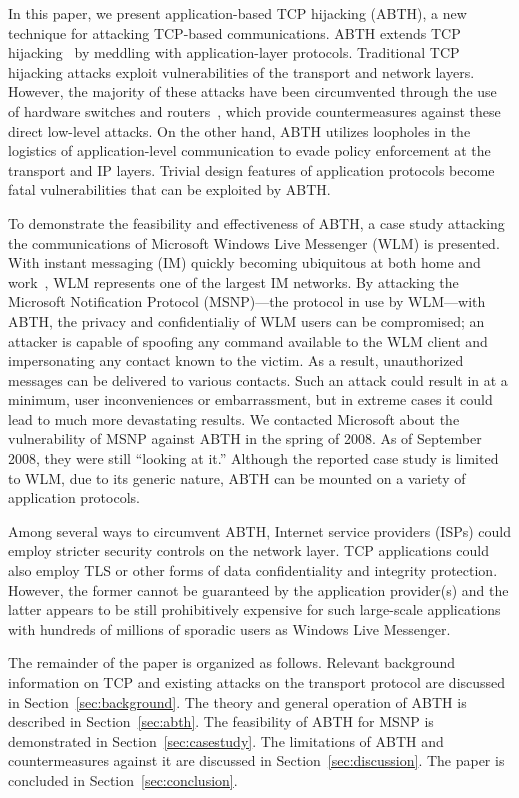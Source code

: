 \documentclass{sig-alternate}
\begin{document}
In this paper, we present application-based TCP hijacking (ABTH), a new technique for attacking TCP-based communications.
ABTH extends TCP hijacking~\cite{stamp:infosec} by meddling with application-layer protocols.
Traditional TCP hijacking attacks exploit vulnerabilities of the transport and network layers.
However, the majority of these attacks have been circumvented through the use of hardware switches and routers~\cite{dubrawsky:layer2}, which provide countermeasures against these direct low-level attacks.
On the other hand, ABTH utilizes loopholes in the logistics of application-level communication to evade policy enforcement at the transport and IP layers.
Trivial design features of application protocols become fatal vulnerabilities that can be exploited by ABTH.

To demonstrate the feasibility and effectiveness of ABTH, a case study attacking the communications of Microsoft Windows Live Messenger (WLM) is presented.
With instant messaging (IM) quickly becoming ubiquitous at both home and work~\cite{aol:survey}, WLM represents one of the largest IM networks.
By attacking the Microsoft Notification Protocol (MSNP)---the protocol in use by WLM---with ABTH, the privacy and confidentialiy of WLM users can be compromised; an attacker is capable of spoofing any command available to the WLM client and impersonating any contact known to the victim.
As a result, unauthorized messages can be delivered to various contacts.
Such an attack could result in at a minimum, user inconveniences or embarrassment, but in extreme cases it could lead to much more devastating results. We contacted Microsoft about the vulnerability of MSNP against ABTH in the spring of 2008. As of September 2008, they were still ``looking at it.'' 
Although the reported case study is limited to WLM, due to its generic nature, ABTH can be mounted on a variety of application protocols.

Among several ways to circumvent ABTH, Internet service providers (ISPs) could employ stricter security controls on the network layer. TCP applications could also employ TLS or other forms of data confidentiality and integrity protection.
However, the former cannot be guaranteed by the application provider(s) and the latter appears to be still prohibitively expensive for such large-scale applications with hundreds of millions of sporadic users as Windows Live Messenger.

The remainder of the paper is organized as follows.
Relevant background information on TCP and existing attacks on the transport protocol are discussed in Section~\ref{sec:background}.
The theory and general operation of ABTH is described in Section~\ref{sec:abth}.
The feasibility of ABTH for MSNP is demonstrated in Section~\ref{sec:casestudy}.
The limitations of ABTH and countermeasures against it are discussed in Section~\ref{sec:discussion}.
The paper is concluded in Section~\ref{sec:conclusion}.
\end{document}
